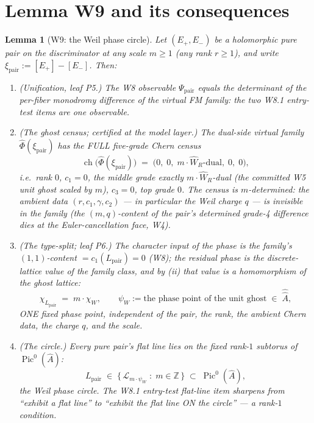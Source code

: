 \documentclass[11pt]{article}
\newtheorem{lemma}{Lemma}[section]
\newcommand{\WR}{W_R}
\newcommand{\ch}{\operatorname{ch}}
\newcommand{\Pic}{\operatorname{Pic}}
\newcommand{\KAd}{\widehat{A}}
\newcommand{\Phit}{\widehat\Phi}
\begin{document}
\section{Lemma W9 and its consequences}

\begin{lemma}[W9: the Weil phase circle]
\label{lem:W9}
Let $(E_+,E_-)$ be a holomorphic pure pair on the discriminator at any scale
$m\ge 1$ (any rank $r\ge 1$), and write
$\xi_{\mathrm{pair}} := [E_+] - [E_-]$. Then:
\begin{enumerate}
\item[(i)] \emph{(Unification, leaf P5.)} The W8 observable
$\Psi_{\mathrm{pair}}$ equals the determinant of the per-fiber monodromy
difference of the virtual FM family: the two W8.1 entry-test items are one
observable.
\item[(ii)] \emph{(The ghost census; certified at the model layer.)} The
dual-side virtual family $\Phit(\xi_{\mathrm{pair}})$ has the FULL five-grade
Chern census
\[
\ch\bigl(\Phit(\xi_{\mathrm{pair}})\bigr)
\;=\;
\bigl(0,\;0,\;m\cdot\widehat\WR\text{-dual},\;0,\;0\bigr),
\]
i.e.\ rank $0$, $c_1 = 0$, the middle grade exactly $m\cdot\widehat\WR$-dual
(the committed W5 unit ghost scaled by $m$), $c_3 = 0$, top grade $0$. The
census is $m$-determined: the ambient data $(r, c_1, \gamma, c_2)$ --- in
particular the Weil charge $q$ --- is invisible in the family (the
$(m,q)$-content of the pair's determined grade-4 difference dies at the
Euler-cancellation face, W4).
\item[(iii)] \emph{(The type-split; leaf P6.)} The character input of the
phase is the family's $(1,1)$-content $= c_1(L_{\mathrm{pair}}) = 0$ (W8);
the residual phase is the discrete-lattice value of the family class, and by
(ii) that value is a homomorphism of the ghost lattice:
\[
\chi_{L_{\mathrm{pair}}} \;=\; m\cdot\chi_W,
\qquad
\psi_W := \text{the phase point of the unit ghost}
\;\in\;\widehat{\KAd},
\]
ONE fixed phase point, independent of the pair, the rank, the ambient
Chern data, the charge $q$, and the scale.
\item[(iv)] \emph{(The circle.)} Every pure pair's flat line lies on the
fixed rank-$1$ subtorus of $\Pic^0(\KAd)$:
\[
L_{\mathrm{pair}} \;\in\;
\bigl\{\,\mathcal{L}_{m\cdot\psi_W}\;:\;m\in\mathbb{Z}\,\bigr\}
\;\subset\;\Pic^0(\KAd),
\]
the \emph{Weil phase circle}. The W8.1 entry-test flat-line item sharpens
from ``exhibit a flat line'' to ``exhibit the flat line ON the circle''
--- a rank-$1$ condition.
\end{enumerate}
\end{lemma}
\end{document}
